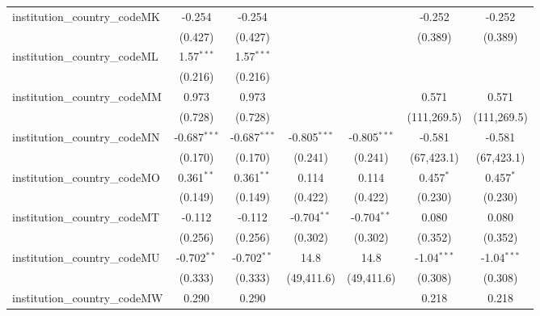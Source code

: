 \begin{tabular}{lcccccc}
   institution\_country\_codeMK          & -0.254         & -0.254         &                &                & -0.252         & -0.252\\   
                                         & (0.427)        & (0.427)        &                &                & (0.389)        & (0.389)\\   
   institution\_country\_codeML          & 1.57$^{***}$   & 1.57$^{***}$   &                &                &                &   \\   
                                         & (0.216)        & (0.216)        &                &                &                &   \\   
   institution\_country\_codeMM          & 0.973          & 0.973          &                &                & 0.571          & 0.571\\   
                                         & (0.728)        & (0.728)        &                &                & (111,269.5)    & (111,269.5)\\   
   institution\_country\_codeMN          & -0.687$^{***}$ & -0.687$^{***}$ & -0.805$^{***}$ & -0.805$^{***}$ & -0.581         & -0.581\\   
                                         & (0.170)        & (0.170)        & (0.241)        & (0.241)        & (67,423.1)     & (67,423.1)\\   
   institution\_country\_codeMO          & 0.361$^{**}$   & 0.361$^{**}$   & 0.114          & 0.114          & 0.457$^{*}$    & 0.457$^{*}$\\   
                                         & (0.149)        & (0.149)        & (0.422)        & (0.422)        & (0.230)        & (0.230)\\   
   institution\_country\_codeMT          & -0.112         & -0.112         & -0.704$^{**}$  & -0.704$^{**}$  & 0.080          & 0.080\\   
                                         & (0.256)        & (0.256)        & (0.302)        & (0.302)        & (0.352)        & (0.352)\\   
   institution\_country\_codeMU          & -0.702$^{**}$  & -0.702$^{**}$  & 14.8           & 14.8           & -1.04$^{***}$  & -1.04$^{***}$\\   
                                         & (0.333)        & (0.333)        & (49,411.6)     & (49,411.6)     & (0.308)        & (0.308)\\   
   institution\_country\_codeMW          & 0.290          & 0.290          &                &                & 0.218          & 0.218\\   

\end{tabular}
